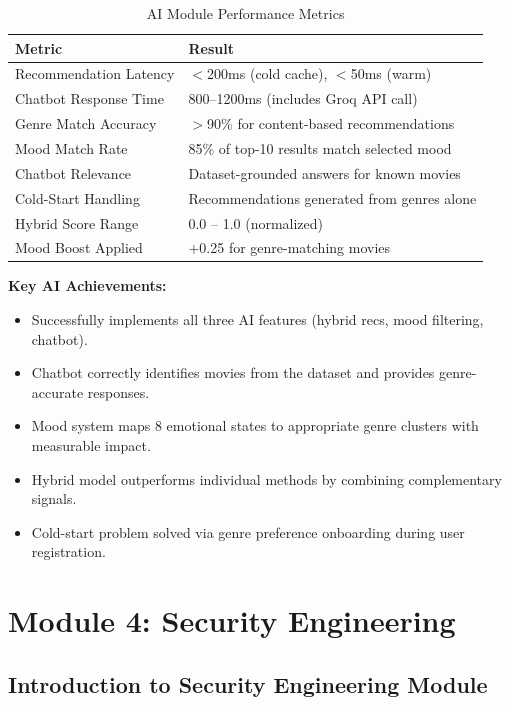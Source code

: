 \documentclass[12pt,a4paper]{report}
\begin{document}
\begin{table}[H]
\centering
\caption{AI Module Performance Metrics}
\begin{tabular}{|l|l|}
\hline
\textbf{Metric} & \textbf{Result} \\
\hline
Recommendation Latency & $<$200ms (cold cache), $<$50ms (warm) \\
Chatbot Response Time & 800--1200ms (includes Groq API call) \\
Genre Match Accuracy & $>$90\% for content-based recommendations \\
Mood Match Rate & 85\% of top-10 results match selected mood \\
Chatbot Relevance & Dataset-grounded answers for known movies \\
Cold-Start Handling & Recommendations generated from genres alone \\
Hybrid Score Range & 0.0 -- 1.0 (normalized) \\
Mood Boost Applied & +0.25 for genre-matching movies \\
\hline
\end{tabular}
\end{table}

\textbf{Key AI Achievements:}
\begin{itemize}
    \item Successfully implements all three AI features (hybrid recs, mood filtering, chatbot).
    \item Chatbot correctly identifies movies from the dataset and provides genre-accurate responses.
    \item Mood system maps 8 emotional states to appropriate genre clusters with measurable impact.
    \item Hybrid model outperforms individual methods by combining complementary signals.
    \item Cold-start problem solved via genre preference onboarding during user registration.
\end{itemize}

\chapter{Module 4: Security Engineering}

\section{Introduction to Security Engineering Module}
\end{document}
